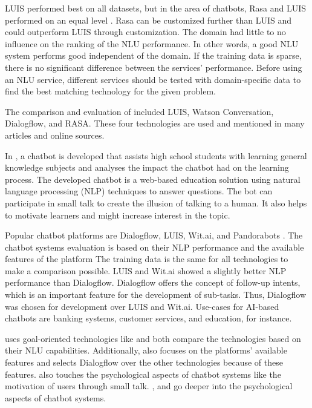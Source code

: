 LUIS performed best on all datasets, but in the area of chatbots, Rasa and LUIS performed on an equal level \cite{braunEvaluatingNLU}.
Rasa can be customized further than LUIS and could outperform LUIS through customization. 
The domain had little to no influence on the ranking of the NLU performance.
In other words, a good NLU system performs good independent of the domain.
If the training data is sparse, there is no significant difference between the services' performance. 
Before using an NLU service, different services should be tested with domain-specific data to find the best matching technology for the given problem.

The comparison and evaluation of \citet{braunEvaluatingNLU} included LUIS, Watson Conversation, Dialogflow, and RASA.
These four technologies are used and mentioned in many articles and online sources. 

In \citet{dutta2017developing}, a chatbot is developed that assists high school students with learning general knowledge subjects and analyses the impact the chatbot had on the learning process.
The developed chatbot is a web-based education solution using natural language processing (NLP) techniques to answer questions.
The bot can participate in small talk to create the illusion of talking to a human.
It also helps to motivate learners and might increase interest in the topic.

Popular chatbot platforms are Dialogflow, LUIS, Wit.ai, and Pandorabots \cite{dutta2017developing}.
The chatbot systems evaluation is based on their NLP performance and the available features of the platform
The training data is the same for all technologies to make a comparison possible. 
LUIS and Wit.ai showed a slightly better NLP performance than Dialogflow.
Dialogflow offers the concept of follow-up intents, which is an important feature for the development of sub-tasks.
Thus, Dialogflow was chosen for development over LUIS and Wit.ai.
Use-cases for AI-based chatbots are banking systems, customer services, and education, for instance.

\citet{dutta2017developing} uses goal-oriented technologies like \citet{braunEvaluatingNLU} and both compare the technologies based on their NLU capabilities.
Additionally, \citet{dutta2017developing} also focuses on the platforms' available features and selects Dialogflow over the other technologies because of these features.
\citet{dutta2017developing} also touches the psychological aspects of chatbot systems like the motivation of users through small talk. 
\citet{GO2019304, brandtzaeg2018chatbots}, and \citet{folstad2017chatbots} go deeper into the psychological aspects of chatbot systems.

